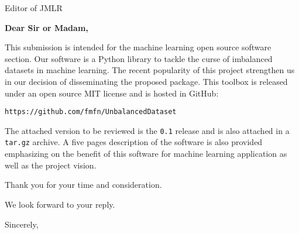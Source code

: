 \documentclass{letter}
\begin{document}

\begin{letter}{Editor of JMLR} %


\opening{\textbf{Dear Sir or Madam,}}

This submission is intended for the machine learning open source software section.
Our software is a Python library to tackle the curse of imbalanced datasets in machine learning.
The recent popularity of this project strengthen us in our decision of disseminating the proposed package. 
This toolbox is released under an open source MIT license and is hosted in GitHub:

\texttt{https://github.com/fmfn/UnbalancedDataset}

The attached version to be reviewed is the \texttt{0.1} release and is also attached in a \texttt{tar.gz} archive.
A five pages description of the software is also provided emphasizing on the benefit of this software for machine learning application as well as the project vision.

Thank you for your time and consideration.

We look forward to your reply.

\vspace{2\parskip} %
\closing{Sincerely,}
\vspace{2\parskip} %


\end{letter}
 
\end{document}
